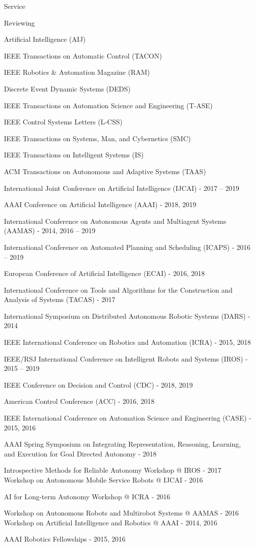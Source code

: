 \begin{rSection}{Service}
\begin{rSubsection}{Reviewing}{}{}{}
\item  Artificial Intelligence (AIJ)
\item  IEEE Transactions on Automatic Control (TACON)
\item  IEEE Robotics \& Automation Magazine (RAM)
\item  Discrete Event Dynamic Systems (DEDS)
\item  IEEE Transactions on Automation Science and Engineering (T-ASE)
\item   IEEE Control Systems Letters (L-CSS)
\item  IEEE Transactions on Systems, Man, and Cybernetics (SMC)
\item   IEEE Transactions on Intelligent Systems (IS)
\item ACM Transactions on Autonomous and Adaptive Systems (TAAS)
\item  International Joint Conference on Artificial Intelligence (IJCAI) - 2017 -- 2019
\item  AAAI Conference on Artificial Intelligence (AAAI) - 2018, 2019
\item  International Conference on Autonomous Agents and Multiagent Systems (AAMAS) - 2014, 2016 -- 2019
\item  International Conference on Automated Planning and Scheduling (ICAPS) - 2016 -- 2019
\item  European Conference of Artificial Intelligence (ECAI) - 2016, 2018
\item  International Conference on Tools and Algorithms for the Construction and Analysis of Systems (TACAS) - 2017
\item  International Symposium on Distributed Autonomous Robotic Systems (DARS) - 2014
\item  IEEE International Conference on Robotics and Automation (ICRA) - 2015, 2018
\item  IEEE/RSJ International Conference on Intelligent Robots and Systems (IROS) - 2015 -- 2019
\item  IEEE Conference on Decision and Control (CDC) - 2018, 2019
\item  American Control Conference (ACC) - 2016, 2018
\item  IEEE International Conference on Automation Science and Engineering (CASE) - 2015, 2016
\item  AAAI Spring Symposium on Integrating Representation, Reasoning, Learning, and Execution for Goal Directed Autonomy - 2018
\item  Introspective Methods for Reliable Autonomy Workshop @ IROS - 2017 Workshop on Autonomous Mobile Service Robots @ IJCAI - 2016
\item  AI for Long-term Autonomy Workshop @ ICRA - 2016
\item  Workshop on Autonomous Robots and Multirobot Systems @ AAMAS - 2016 Workshop on Artificial Intelligence and Robotics @ AAAI - 2014, 2016
\item  AAAI Robotics Fellowships - 2015, 2016
\end{rSubsection}





\end{rSection}
